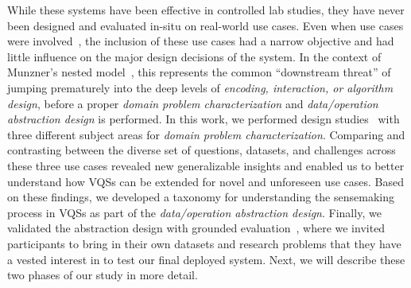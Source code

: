 \par While these systems have been effective in controlled lab studies, they have never been designed and evaluated in-situ on  real-world use cases. Even when use cases were involved~\cite{Hochheiser2004,correll2016semantics}, the inclusion of these use cases had a narrow objective and had little influence on the major design decisions of the system. In the context of Munzner's nested model~\cite{munzner2009nested}, this represents the common ``downstream threat'' of jumping prematurely into the deep levels of \textit{encoding, interaction, or algorithm design}, before a proper \textit{domain problem characterization} and \textit{data/operation abstraction design} is performed. In this work, we performed design studies~\cite{lam2012empirical,shneiderman2006strategies,Sedlmair2012} with three different subject areas for \textit{domain problem characterization}. Comparing and contrasting between the diverse set of questions, datasets, and challenges across these three use cases revealed new generalizable insights and enabled us to better understand how VQSs can be extended for novel and unforeseen use cases. Based on these findings, we developed a taxonomy for understanding the sensemaking process in VQSs as part of the \textit{data/operation abstraction design}. Finally, we validated the abstraction design with grounded evaluation~\cite{Plaisant2004,Isenberg2008}, where we invited participants to bring in their own datasets and research problems that they have a vested interest in to test our final deployed system. Next, we will describe these two phases of our study in more detail.
